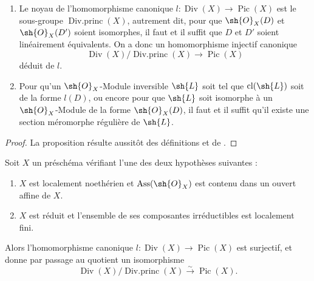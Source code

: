 \begin{proposition}[21.3.3]
\label{IV.21.3.3}
\begin{enumerate}[label=(\roman*)]
  \item Le noyau de l'homomorphisme canonique $l:\operatorname{Div}(X)\to\operatorname{Pic}(X)$ est le sous-groupe $\operatorname{Div.princ}(X)$, autrement dit, pour que $\sh{O}_X(D)$ et $\sh{O}_X(D')$ soient isomorphes, il faut et il suffit que $D$ et $D'$ soient linéairement équivalents.
  On a donc un homomorphisme injectif canonique
  \[
  \label{IV.21.3.3.1}
    \operatorname{Div}(X)/\operatorname{Div.princ}(X)\to\operatorname{Pic}(X)
    \tag{21.3.3.1}
  \]
  déduit de $l$.
  \item Pour qu'un $\sh{O}_X$-Module inversible $\sh{L}$ soit tel que $\operatorname{cl}(\sh{L})$ soit de la forme $l(D)$, ou encore pour que $\sh{L}$ soit isomorphe à un $\sh{O}_X$-Module de la forme $\sh{O}_X(D)$, il faut et il suffit qu'il existe une section méromorphe régulière de $\sh{L}$.
\end{enumerate}
\end{proposition}

\begin{proof}
La proposition résulte aussitôt des définitions et de .
\end{proof}

\begin{proposition}[21.3.4]
\label{IV.21.3.4}
Soit $X$ un préschéma vérifiant l'une des deux hypothèses suivantes :
\begin{enumerate}[label=\emph{\alph*)}]
  \item $X$ est localement noethérien et $\operatorname{Ass}(\sh{O}_X)$ est contenu dans un ouvert affine de $X$.
  \item $X$ est réduit et l'ensemble de ses composantes irréductibles est localement fini.
\end{enumerate}
Alors l'homomorphisme canonique $l:\operatorname{Div}(X)\to\operatorname{Pic}(X)$ est surjectif, et donne par passage au quotient un isomorphisme
\[
  \operatorname{Div}(X)/\operatorname{Div.princ}(X)\xrightarrow{\sim}\operatorname{Pic}(X).
\]
\end{proposition}

